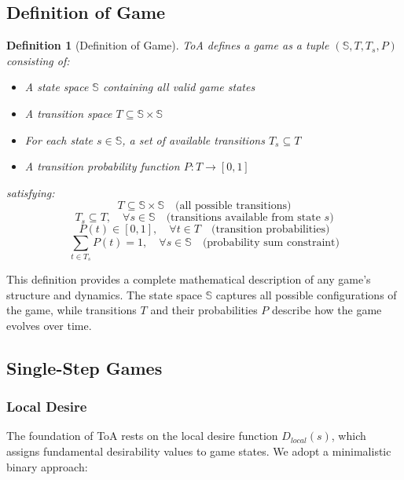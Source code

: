 \documentclass{article}
\newtheorem{definition}{Definition}[]
\begin{document}
\subsection{Definition of Game}
\begin{definition}[Definition of Game]
ToA defines a game as a tuple $(\mathbb{S}, T, T_s, P)$ consisting of:
\begin{itemize}
\item A state space $\mathbb{S}$ containing all valid game states
\item A transition space $T \subseteq \mathbb{S} \times \mathbb{S}$
\item For each state $s \in \mathbb{S}$, a set of available transitions $T_s \subseteq T$
\item A transition probability function $P: T \rightarrow [0,1]$
\end{itemize}
satisfying:
\begin{equation*}
T \subseteq \mathbb{S} \times \mathbb{S} \quad \text{(all possible transitions)}
\end{equation*}
\begin{equation*}
T_s \subseteq T, \quad \forall s \in \mathbb{S} \quad \text{(transitions available from state $s$)}
\end{equation*}
\begin{equation*}
P(t) \in [0,1], \quad \forall t \in T \quad \text{(transition probabilities)}
\end{equation*}
\begin{equation*}
\sum_{t \in T_s} P(t) = 1, \quad \forall s \in \mathbb{S} \quad \text{(probability sum constraint)}
\end{equation*}
\end{definition}
This definition provides a complete mathematical description of any game's structure and dynamics. The state space $\mathbb{S}$ captures all possible configurations of the game, while transitions $T$ and their probabilities $P$ describe how the game evolves over time.

\subsection{Single-Step Games}

\subsubsection{Local Desire}
The foundation of ToA rests on the local desire function $D_{local}(s)$, which assigns fundamental desirability values to game states. We adopt a minimalistic binary approach:
\end{document}

